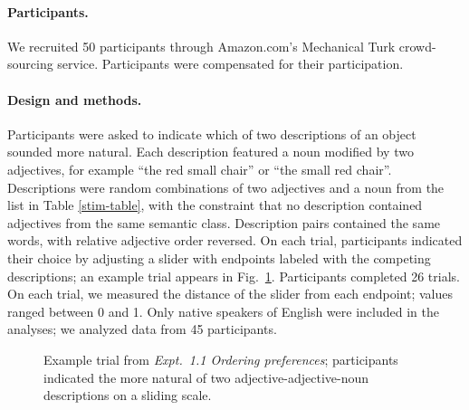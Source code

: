 \documentclass[manuscript]{stjour}
\begin{document}
\paragraph{Participants.} We recruited 50 participants through Amazon.com's Mechanical Turk crowd-sourcing service. Participants were compensated 
for their participation. 

\paragraph{Design and methods.} Participants were asked to indicate which of two descriptions of an object sounded more natural. Each description featured a noun modified by two adjectives, for example ``the red small chair'' or ``the small red chair''. Descriptions were random combinations of two adjectives and a noun from the list in Table \ref{stim-table}, with the constraint that no description contained adjectives from the same semantic class. Description pairs contained the same words, with relative adjective order reversed. 
On each trial, participants indicated their choice by adjusting a slider with endpoints labeled with the competing descriptions; an example trial appears in Fig.\ \ref{order-trial}. Participants completed 26 trials. On each trial, we measured the distance of the slider from each endpoint; values ranged between 0 and 1. Only native speakers of English 
were included in the analyses; we analyzed data from 45 participants. 

\begin{figure}[h]
	\centering
	\caption{Example trial from \emph{Expt.\ 1.1 Ordering preferences}; participants indicated the more natural of two adjective-adjective-noun descriptions on a sliding scale.}\label{order-trial}
\end{figure}
\end{document}
